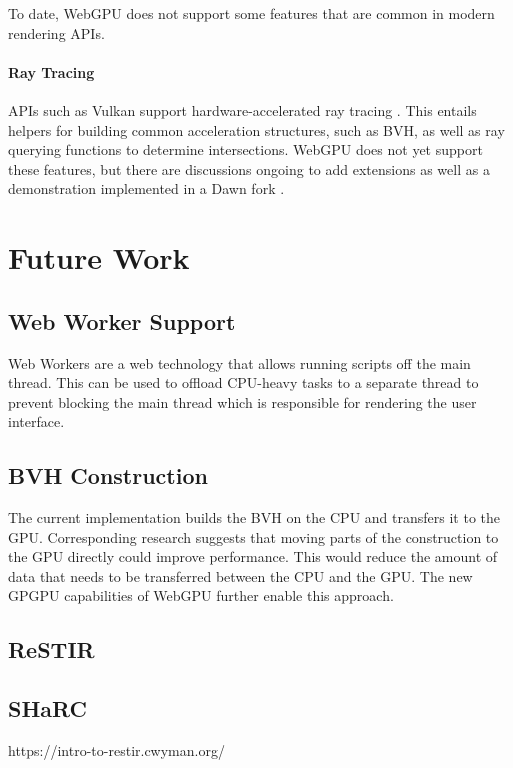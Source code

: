 To date, WebGPU does not support some features that are common in modern rendering APIs.

\paragraph{Ray Tracing}

\glspl{API} such as Vulkan support hardware-accelerated ray tracing \cite{vulkanRayTracing}. This entails helpers for building common acceleration structures, such as \gls{BVH}, as well as ray querying functions to determine intersections. WebGPU does not yet support these features, but there are discussions ongoing to add extensions \cite{webGPURayTracing} as well as a demonstration implemented in a Dawn fork \cite{webGPURayTracingFork}.


\section{Future Work}

\subsection{Web Worker Support}

Web Workers are a web technology that allows running scripts off the main thread. This can be used to offload \gls{CPU}-heavy tasks to a separate thread to prevent blocking the main thread which is responsible for rendering the user interface.

\subsection{BVH Construction}

The current implementation builds the \gls{BVH} on the \gls{CPU} and transfers it to the \gls{GPU}. Corresponding research \cite{lauterbach2009GPUbvh} suggests that moving parts of the construction to the \gls{GPU} directly could improve performance. This would reduce the amount of data that needs to be transferred between the \gls{CPU} and the \gls{GPU}. The new \gls{GPGPU} capabilities of WebGPU further enable this approach.

\subsection{ReSTIR}
\subsection{SHaRC}

https://intro-to-restir.cwyman.org/